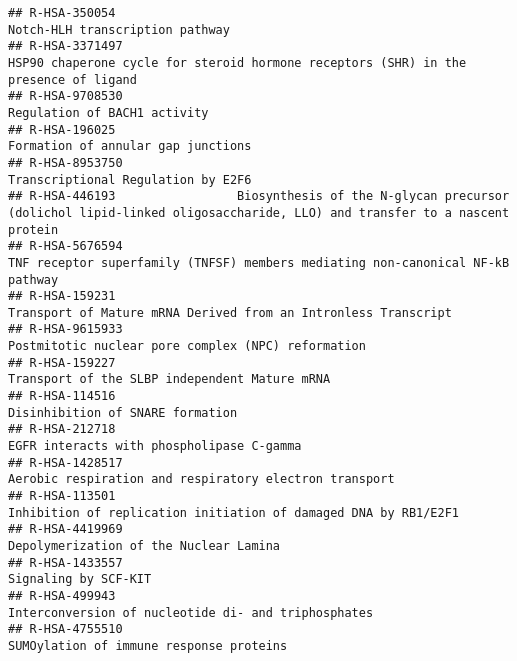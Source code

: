 \documentclass[
]{article}
\begin{document}
\begin{verbatim}
## R-HSA-350054                                                                                                       Notch-HLH transcription pathway
## R-HSA-3371497                                                  HSP90 chaperone cycle for steroid hormone receptors (SHR) in the presence of ligand
## R-HSA-9708530                                                                                                         Regulation of BACH1 activity
## R-HSA-196025                                                                                                    Formation of annular gap junctions
## R-HSA-8953750                                                                                                   Transcriptional Regulation by E2F6
## R-HSA-446193                 Biosynthesis of the N-glycan precursor (dolichol lipid-linked oligosaccharide, LLO) and transfer to a nascent protein
## R-HSA-5676594                                                       TNF receptor superfamily (TNFSF) members mediating non-canonical NF-kB pathway
## R-HSA-159231                                                                        Transport of Mature mRNA Derived from an Intronless Transcript
## R-HSA-9615933                                                                                   Postmitotic nuclear pore complex (NPC) reformation
## R-HSA-159227                                                                                         Transport of the SLBP independent Mature mRNA
## R-HSA-114516                                                                                                      Disinhibition of SNARE formation
## R-HSA-212718                                                                                             EGFR interacts with phospholipase C-gamma
## R-HSA-1428517                                                                               Aerobic respiration and respiratory electron transport
## R-HSA-113501                                                                       Inhibition of replication initiation of damaged DNA by RB1/E2F1
## R-HSA-4419969                                                                                               Depolymerization of the Nuclear Lamina
## R-HSA-1433557                                                                                                                 Signaling by SCF-KIT
## R-HSA-499943                                                                                   Interconversion of nucleotide di- and triphosphates
## R-HSA-4755510                                                                                              SUMOylation of immune response proteins

\end{verbatim}
\end{document}

